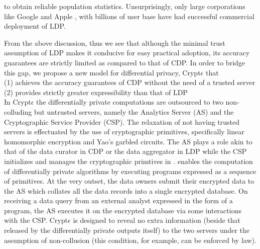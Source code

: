 to obtain reliable population statistics. Unsurprisingly, only large corporations  like Google \cite{Rappor1,Rappor2,Prochlo} and Apple \cite{Apple}, with  billions of user base have had successful commercial deployment of \textsf{LDP}. %
\par From the above discussion, thus we see that although the minimal trust assumption of \textsf{LDP} makes it conducive for easy practical adoption, its accuracy guarantees are strictly limited as compared to that of \textsf{CDP}. In order to bridge this gap, we propose a new model for differential privacy, Crypt$\epsilon$ that  \\(1) achieves the accuracy guarantees of  \textsf{CDP}  without the need of a trusted server \\(2) provides strictly greater expressibility than that of  \textsf{LDP}  \\ 
In Crypt$\epsilon$ the differentially private computations are outsourced to two non-colluding but untrusted servers, namely the Analytics Server (\textsf{AS}) and the Cryptographic Service Provider (\textsf{CSP}). The relaxation of not having trusted servers is effectuated by the use of cryptographic primitives, specifically linear homomorphic encryption and Yao's garbled circuits. The \textsf{AS} plays a role akin to that of the data curator in \textsf{CDP} or the data aggregator in \textsf{LDP} while the \textsf{CSP} initializes and manages the cryptographic primtives in \system. \system enables the computation of differentially private algorithms by executing programs expressed as a sequence of \system primitives. At the very outset, the data owners submit their encrypted data to the \textsf{AS} which collates all the data records into a single encrypted database.  On receiving a data query from an external analyst expressed in the form of a \system program, the \textsf{AS} executes it on the encrypted database via some interactions with the \textsf{CSP}.  Crypt$\epsilon$ is designed to reveal no extra information (beside that released by the differentially private outputs itself) to
the two servers under the assumption of  non-collusion (this condition, for example, can be enforced by law). 
